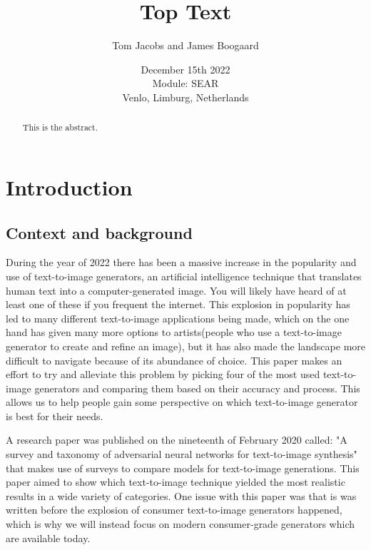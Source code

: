 \documentclass[]{report}
\title{Top Text}
\author{Tom Jacobs and James Boogaard}
\date{December 15th 2022 \\Module: SEAR \\Venlo, Limburg, Netherlands}
\begin{document}
	
	\maketitle
	
	\begin{abstract}
		This is the abstract.
		
		
	\end{abstract}
	
	\tableofcontents
	\setcounter{page}{3}
	\listoffigures %
	\pagebreak
	
	
	\section{Introduction}
	
	\subsection{Context and background}
During the year of 2022 there has been a massive increase in the popularity and use of text-to-image generators, an artificial intelligence technique that translates human text into a computer-generated image. You will likely have heard of at least one of these if you frequent the internet. This explosion in popularity has led to many different text-to-image applications being made, which on the one hand has given many more options to artists(people who use a text-to-image generator to create and refine an image), but it has also made the landscape more difficult to navigate because of its abundance of choice. This paper makes an effort to try and alleviate this problem by picking four of the most used text-to-image generators and comparing them based on their accuracy and process. This allows us to help people gain some perspective on which text-to-image generator is best for their needs.

A research paper was published on the nineteenth of February 2020 called: "A survey and taxonomy of adversarial neural networks for text-to-image synthesis" that makes use of surveys to compare models for text-to-image generations. This paper aimed to show which text-to-image technique yielded the most realistic results in a wide variety of categories. One issue with this paper was that is was written before the explosion of consumer text-to-image generators happened, which is why we will instead focus on modern consumer-grade generators which are available today.
\end{document}
